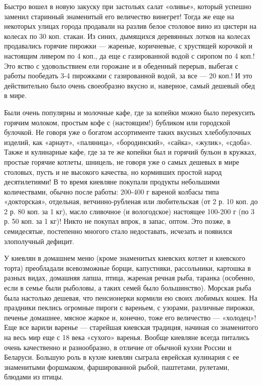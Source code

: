 Быстро вошел в новую закуску при застольях салат «оливье», который успешно
заменил старинный знаменитый его величество винегрет! Тогда же еще на некоторых
улицах города продавали на разлив белое столовое вино из цистерн на колесах по
30 коп. стакан. Из синих, дымящихся деревянных лотков на колесах продавались
горячие пирожки --- жареные, коричневые, с хрустящей корочкой и настоящим ливером
по 4 коп., да еще с газированной водой с сиропом по 4 коп.! Это яство с
удовольствием ели горожане и в обеденный перерыв, выбегая с работы пообедать
3-4 пирожками с газированной водой, за все --- 20 коп.! И это действительно было
очень своеобразно вкусно и, наверное, самый дешевый обед в мире. 

Были очень популярны и молочные кафе, где за копейки можно было перекусить
горячим молоком, простым кофе с (настоящим!) бубликом или городской булочкой.
Не говоря уже о богатом ассортименте таких вкусных хлебобулочных изделий, как
«арнаут», «паляница», «бородинский», «сайка», «жулик», «сдоба». Также и
кулинарные кафе, где за те же копейки был и горячий бульон в кружках, простые
горячие котлеты, шницель, не говоря уже о самых дешевых в мире столовых, пусть
и не высокого качества, но кормивших простой народ десятилетиями!  В то время
киевляне покупали продукты небольшими количествами, обычно после работы:
200-400 г вареной колбасы типа «докторская», отдельная, ветчинно-рубленая или
любительская (от 2 р. 10 коп. до 2 р. 80 коп. за 1 кг), масло сливочное (и
вологодское) настоящее 100-200 г (по 3 р. 50 коп. за 1 кг)! Никто не покупал
впрок, в запас, оптом. Это позже, в семидесятые, постепенно многого стало
недоставать, исчезать и появился злополучный дефицит. 

У киевлян в домашнем меню (кроме знаменитых киевских котлет и киевского торта)
преобладали всевозможные борщи, капустняки, рассольники, картошка в разных
видах, домашняя лапша, птица, жареная речная рыба, таранка (особенно, если в
семье были рыболовы, а таких семей было большинство). Морская рыба была
настолько дешевая, что пенсионерки кормили ею своих любимых кошек. На праздники
пеклись огромные пироги с вареньем, с узорами, различные пирожки, печенье
домашнее, мясное жаркое и, конечно, тоже его величество --- «холодец»! Еще все
варили варенье --- старейшая киевская традиция, начиная со знаменитого на весь
мир еще с 18 века «сухого» варенья. Вообще киевляне всегда питались очень
качественно и разнообразно, в отличие от обычной кухни России и Беларуси.
Большую роль в кухне киевлян сыграла еврейская кулинария с ее знаменитыми
форшмаком, фаршированной рыбой, паштетами, рулетами, блюдами из птицы. 

